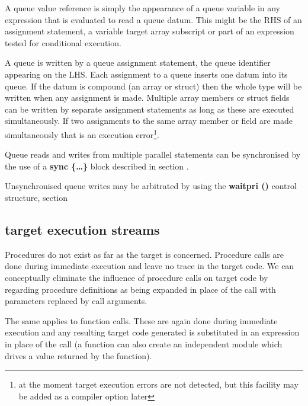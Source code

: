             A queue value reference is simply the appearance of a queue variable
            in any expression that is evaluated to read a queue datum. This might
            be the RHS of an assignment statement, a variable target array
            subscript or part of an expression tested for conditional execution.

            A queue is written by a queue assignment statement, the queue
            identifier appearing on the LHS. Each assignment to a queue
            inserts one datum into its queue. If the datum is compound (an
            array or struct) then the whole type will be written when any
            assignment is made. Multiple array members or struct fields can
            be written by separate assignment statements as long as these are
            executed simultaneously. If two assignments to the same array
            member or field are made simultaneously that is an execution
            error\footnote{at the moment target execution errors are not
            detected, but this facility may be added as a compiler option
            later}.

            Queue reads and writes from multiple parallel statements can be
            synchronised by the use of a {\bf sync \{\dots\}} block described
            in section .
            
            Unsynchronised queue writes may be arbitrated by using the {\bf
            waitpri ()} control structure, section 
    
        \subsection{target execution streams}

            Procedures do not exist as far as the target is concerned.
            Procedure calls are done during immediate execution and leave no
            trace in the target code. We can conceptually eliminate the
            influence of procedure calls on target code by regarding
            procedure definitions as being expanded in place of the call with
            parameters replaced by call arguments.

            The same applies to function calls. These are again done during
            immediate execution and any resulting target code generated is
            substituted in an expression in place of the call (a function
            can also create an independent module which drives a value
            returned by the function).

